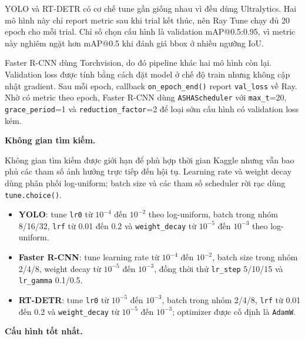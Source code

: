YOLO và RT-DETR có cơ chế tune gần giống nhau vì đều dùng Ultralytics. Hai mô hình này chỉ report metric sau khi trial kết thúc, nên Ray Tune chạy đủ 20 epoch cho mỗi trial. Chỉ số chọn cấu hình là validation mAP@0.5:0.95, vì metric này nghiêm ngặt hơn mAP@0.5 khi đánh giá bbox ở nhiều ngưỡng IoU.

Faster R-CNN dùng Torchvision, do đó pipeline khác hai mô hình còn lại. Validation loss được tính bằng cách đặt model ở chế độ train nhưng không cập nhật gradient. Sau mỗi epoch, callback \texttt{on\_epoch\_end()} report \texttt{val\_loss} về Ray. Nhờ có metric theo epoch, Faster R-CNN dùng \texttt{ASHAScheduler} với \texttt{max\_t}=20, \texttt{grace\_period}=1 và \texttt{reduction\_factor}=2 để loại sớm cấu hình có validation loss kém.

\textbf{Không gian tìm kiếm.}

Không gian tìm kiếm được giới hạn để phù hợp thời gian Kaggle nhưng vẫn bao phủ các tham số ảnh hưởng trực tiếp đến hội tụ. Learning rate và weight decay dùng phân phối log-uniform; batch size và các tham số scheduler rời rạc dùng \texttt{tune.choice()}.

\begin{itemize}
    \item \textbf{YOLO}: tune \texttt{lr0} từ $10^{-4}$ đến $10^{-2}$ theo log-uniform, batch trong nhóm 8/16/32, \texttt{lrf} từ 0.01 đến 0.2 và \texttt{weight\_decay} từ $10^{-5}$ đến $10^{-3}$ theo log-uniform.
    \item \textbf{Faster R-CNN}: tune learning rate từ $10^{-4}$ đến $10^{-2}$, batch size trong nhóm 2/4/8, weight decay từ $10^{-5}$ đến $10^{-3}$, đồng thời thử \texttt{lr\_step} 5/10/15 và \texttt{lr\_gamma} 0.1/0.5.
    \item \textbf{RT-DETR}: tune \texttt{lr0} từ $10^{-5}$ đến $10^{-3}$, batch trong nhóm 2/4/8, \texttt{lrf} từ 0.01 đến 0.2 và \texttt{weight\_decay} từ $10^{-5}$ đến $10^{-3}$; optimizer được cố định là \texttt{AdamW}.
\end{itemize}

\textbf{Cấu hình tốt nhất.}


